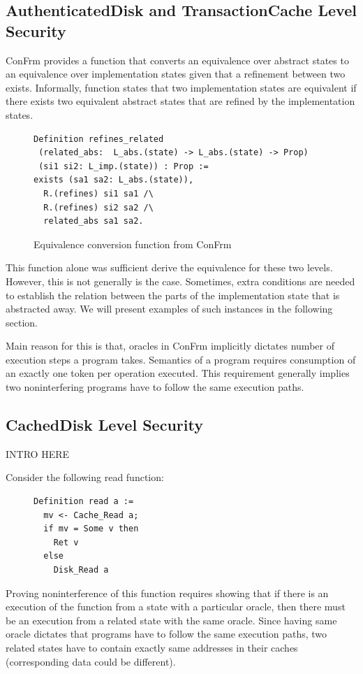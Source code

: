 \subsection{AuthenticatedDisk and TransactionCache Level Security}
ConFrm provides a function that converts an equivalence over abstract states to an equivalence over implementation states given that a refinement between two exists. Informally, function states that two implementation states are equivalent if there exists two equivalent abstract states that are refined by the implementation states.

\begin{figure}[ht]
    \centering
\begin{verbatim}
Definition refines_related 
 (related_abs:  L_abs.(state) -> L_abs.(state) -> Prop)
 (si1 si2: L_imp.(state)) : Prop :=
exists (sa1 sa2: L_abs.(state)),
  R.(refines) si1 sa1 /\
  R.(refines) si2 sa2 /\
  related_abs sa1 sa2.
\end{verbatim}
    \caption{Equivalence conversion function from ConFrm}
    \label{fig:refines_related}
\end{figure}

This function alone was sufficient derive the equivalence for these two levels. However, this is not generally is the case. Sometimes, extra conditions are needed to establish the relation between the parts of the implementation state that is abstracted away. We will present examples of such instances in the following section.

Main reason for this is that, oracles in ConFrm implicitly dictates number of execution steps a program takes. Semantics of a program requires consumption of an exactly one token per operation executed. This requirement generally implies two noninterfering programs have to follow the same execution paths. 


\subsection{CachedDisk Level Security}
{\color{red} INTRO HERE}

Consider the following read function:

\begin{figure}[ht]
    \centering
\begin{verbatim}
Definition read a :=
  mv <- Cache_Read a;
  if mv = Some v then 
    Ret v
  else
    Disk_Read a
\end{verbatim}
    \label{fig:refines_related}
\end{figure}
%
Proving noninterference of this function requires showing that if there is an execution of the function from a state with a particular oracle, then there must be an execution from a related state with the same oracle. Since having same oracle dictates that programs have to follow the same execution paths, two related states have to contain exactly same addresses in their caches (corresponding data could be different).


